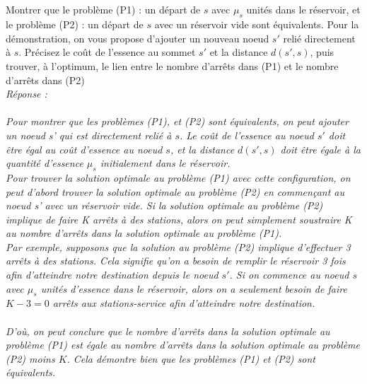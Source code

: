 \documentclass[a4paper,11pt]{article}
\begin{document}
        \subsection{}\label{subsec:Q1}
        Montrer que le problème (P1) : un départ de $s$ avec $\mu_s$ unités dans le réservoir, et le problème (P2) : un départ de $s$ avec un réservoir vide sont équivalents. Pour la démonstration, on vous propose d’ajouter un nouveau noeud $s'$ relié directement à $s$. Précisez le coût de l’essence au sommet $s'$ et la distance $d(s', s)$, puis trouver, à l’optimum, le lien entre le nombre d’arrêts dans (P1) et le nombre d’arrêts dans (P2)\\
		\textit{ Réponse : \\\\
		Pour montrer que les problèmes (P1), et (P2) sont équivalents, on peut ajouter un noeud s' qui est directement relié à $s$. 
Le coût de l'essence au noeud $s'$ doit être égal au coût d'essence au noeud $s$, et la distance $d(s', s)$ doit être égale à la quantité d'essence $\mu_s$ initialement dans le réservoir.\\
Pour trouver la solution optimale au problème (P1) avec cette configuration, on peut d'abord trouver la solution optimale au problème (P2) en commençant au noeud s' avec un réservoir vide. Si la solution optimale au problème (P2) implique de faire K arrêts à des stations, alors on peut simplement soustraire K au nombre d'arrêts dans la solution optimale au problème (P1).\\
Par exemple, supposons que la solution au problème (P2) implique d'effectuer 3 arrêts à des stations. Cela signifie qu'on a besoin de remplir le réservoir 3 fois afin d'atteindre notre destination depuis le noeud $s'$. Si on commence au noeud $s$ avec $\mu_s$ unités d'essence dans le réservoir, alors on a seulement besoin de faire $K - 3 = 0$ arrêts aux stations-service afin d'atteindre notre destination. \\\\
D'où, on peut conclure que le nombre d'arrêts dans la solution optimale au problème (P1) est égale au nombre d'arrêts dans la solution optimale au problème (P2) moins $K$. Cela démontre bien que les problèmes (P1) et (P2) sont équivalents.}
\end{document}
